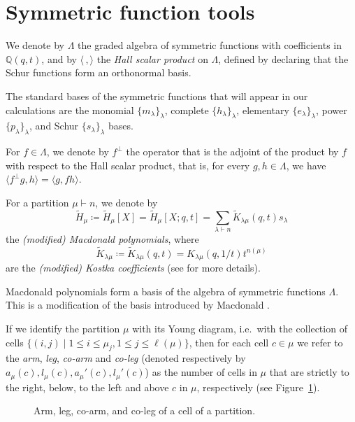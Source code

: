 \documentclass[reqno]{amsart}
\theoremstyle{plain}
\theoremstyle{definition}
\theoremstyle{remark}
\newcommand{\Ht}{\widetilde{H}}
\newcommand{\<}{\langle}
\renewcommand{\>}{\rangle}
\begin{document}
\section{Symmetric function tools}
\label{sec:symmetric_functions}

We denote by $\Lambda$ the graded algebra of symmetric functions with coefficients in $\mathbb{Q}(q,t)$, and by $\<\, , \>$ the \emph{Hall scalar product} on $\Lambda$, defined by declaring that the Schur functions form an orthonormal basis.

The standard bases of the symmetric functions that will appear in our calculations are the monomial $\{m_\lambda\}_{\lambda}$, complete $\{h_{\lambda}\}_{\lambda}$, elementary $\{e_{\lambda}\}_{\lambda}$, power $\{p_{\lambda}\}_{\lambda}$, and Schur $\{s_{\lambda}\}_{\lambda}$ bases.

For $f \in \Lambda$, we denote by $f^\perp$ the operator that is the adjoint of the product by $f$ with respect to the Hall scalar product, that is, for every $g, h \in \Lambda$, we have $\< f^\perp g, h \> = \< g, fh \>$.

For a partition $\mu \vdash n$, we denote by \[ \Ht_\mu \coloneqq \Ht_\mu[X] = \Ht_\mu[X; q,t] = \sum_{\lambda \vdash n} \widetilde{K}_{\lambda \mu}(q,t) s_{\lambda} \] the \emph{(modified) Macdonald polynomials}, where \[ \widetilde{K}_{\lambda \mu} \coloneqq \widetilde{K}_{\lambda \mu}(q,t) = K_{\lambda \mu}(q,1/t) t^{n(\mu)} \] are the \emph{(modified) Kostka coefficients} (see \cite[Chapter~2]{Haglund2008Book} for more details).

Macdonald polynomials form a basis of the algebra of symmetric functions $\Lambda$. This is a modification of the basis introduced by Macdonald \cite{Macdonald1995Book}.

If we identify the partition $\mu$ with its Young diagram, i.e.\ with the collection of cells $\{(i,j)\mid 1\leq i\leq \mu_j, 1\leq j\leq \ell(\mu)\}$, then for each cell $c\in \mu$ we refer to the \emph{arm}, \emph{leg}, \emph{co-arm} and \emph{co-leg} (denoted respectively by $a_\mu(c), l_\mu(c), a_\mu'(c), l_\mu'(c)$) as the number of cells in $\mu$ that are strictly to the right, below, to the left and above $c$ in $\mu$, respectively (see Figure~\ref{fig:notation}).

\begin{figure}
    \centering
    \caption{Arm, leg, co-arm, and co-leg of a cell of a partition.}
    \label{fig:notation}
\end{figure}
\end{document}

